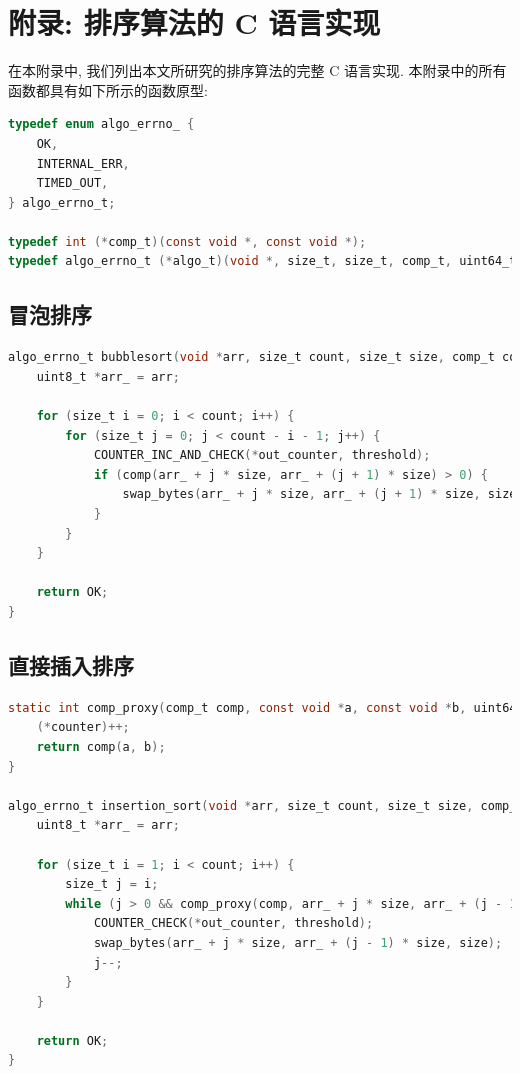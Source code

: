 \documentclass[12pt]{article}
\begin{document}
\appendix

\section{附录: 排序算法的 C 语言实现}

在本附录中, 我们列出本文所研究的排序算法的完整 C 语言实现. 本附录中的所有函数都具有如下所示的函数原型:
\begin{lstlisting}[language=C]
typedef enum algo_errno_ {
    OK,
    INTERNAL_ERR,
    TIMED_OUT,
} algo_errno_t;

typedef int (*comp_t)(const void *, const void *);
typedef algo_errno_t (*algo_t)(void *, size_t, size_t, comp_t, uint64_t, uint64_t *);
\end{lstlisting}

\subsection{冒泡排序}

\begin{lstlisting}[language=C]
algo_errno_t bubblesort(void *arr, size_t count, size_t size, comp_t comp, uint64_t threshold, uint64_t *out_counter) {
    uint8_t *arr_ = arr;

    for (size_t i = 0; i < count; i++) {
        for (size_t j = 0; j < count - i - 1; j++) {
            COUNTER_INC_AND_CHECK(*out_counter, threshold);
            if (comp(arr_ + j * size, arr_ + (j + 1) * size) > 0) {
                swap_bytes(arr_ + j * size, arr_ + (j + 1) * size, size);
            }
        }
    }

    return OK;
}
\end{lstlisting}

\subsection{直接插入排序}

\begin{lstlisting}[language=C]
static int comp_proxy(comp_t comp, const void *a, const void *b, uint64_t *counter) {
    (*counter)++;
    return comp(a, b);
}

algo_errno_t insertion_sort(void *arr, size_t count, size_t size, comp_t comp, uint64_t threshold, uint64_t *out_counter) {
    uint8_t *arr_ = arr;

    for (size_t i = 1; i < count; i++) {
        size_t j = i;
        while (j > 0 && comp_proxy(comp, arr_ + j * size, arr_ + (j - 1) * size, out_counter) < 0) {
            COUNTER_CHECK(*out_counter, threshold);
            swap_bytes(arr_ + j * size, arr_ + (j - 1) * size, size);
            j--;
        }
    }

    return OK;
}
\end{lstlisting}
\end{document}
